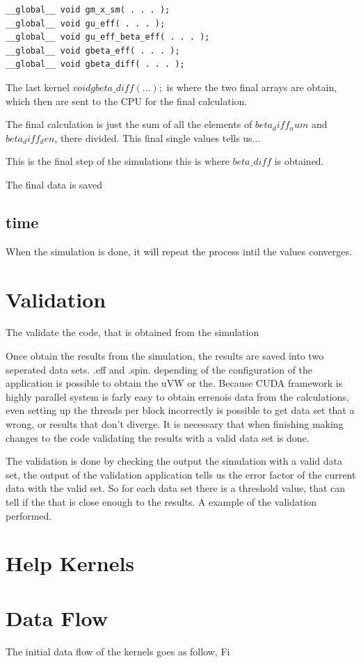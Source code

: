 \begin{lstlisting}[frame=none]
__global__ void gm_x_sm( . . . );
__global__ void gu_eff( . . . );
__global__ void gu_eff_beta_eff( . . . );
__global__ void gbeta_eff( . . . );
__global__ void gbeta_diff( . . . );
\end{lstlisting}

The last kernel $ void gbeta\_diff( . . . );$ is where the two final arrays are obtain,
which then are sent to the CPU for the final calculation.

The final calculation is just the sum of all the elements of $beta_diff_num$ and $beta_diff_den$, there divided.
This final single values tells us...


This is the final step of the simulations this is where $beta\_diff$ is obtained. 

The final data is saved
\subsection{time}

When the simulation is done, it will repeat the process intil the values converges.


\section{Validation}

The validate the code, that is obtained from the simulation

Once obtain the results from the simulation, the results are saved into two seperated data sets. .eff and .spin. depending of the configuration of the application is possible to obtain the uVW or the. Because CUDA framework is highly parallel system is farly easy to obtain errenois data from the calculations, even setting up the threads per block incorrectly is possible to get data set that a wrong, or results that don't diverge. It is necessary that when finishing making changes to the code validating the results with a valid data set is done.

The validation is done by checking the output the simulation with a valid data set, the output of the validation application tells us the error factor of the current data with the valid set. So for each data set there is a threshold value, that can tell if the that is close enough to the results. A example of the validation performed.


\section{Help Kernels}



\section{Data Flow}


The initial data flow of the kernels goes as follow, Fi
